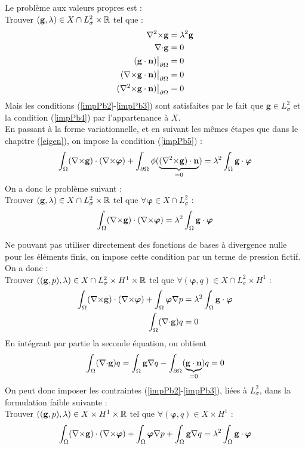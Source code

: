 Le problème aux valeurs propres est :\\
Trouver $(\mathbf{g},\lambda)\in X\cap L^2_\sigma\times{\mathbb{R}}$ tel que :
\begin{align}
{\nabla^2\times}\mathbf{g}&=\lambda^2\mathbf{g} \label{impPb1}\\
{\nabla\cdot}\mathbf{g}&=0 \label{impPb2}\\
(\mathbf{g}\cdot\mathbf{n}){\big\rvert_{\partial\Omega}}&=0 \label{impPb3}\\
({\nabla\times}\mathbf{g}\cdot\mathbf{n}){\big\rvert_{\partial\Omega}}&=0 \label{impPb4}\\
({\nabla^2\times}\mathbf{g}\cdot\mathbf{n}){\big\rvert_{\partial\Omega}}&=0 \label{impPb5}
\end{align}
Mais les conditions (\ref{impPb2}-\ref{impPb3}) sont satisfaites par le fait que $\mathbf{g}\in L^2_\sigma$ et la condition (\ref{impPb4}) par l'appartenance à $X$.\\

En passant à la forme variationnelle, et en suivant les mêmes étapes que dans le chapitre (\ref{eigen}), on impose la condition (\ref{impPb5}) :
\[ \int_\Omega ({\nabla\times}\mathbf{g})\cdot({\nabla\times}\bm{\varphi}) + \int_{\partial\Omega} \phi(\underbrace{({\nabla^2\times} \mathbf{g})\cdot\mathbf{n}}_{=0})= \lambda^2\int_\Omega \mathbf{g}\cdot\bm{\varphi} \]
On a donc le problème suivant :\\
Trouver $(\mathbf{g},\lambda)\in X\cap L^2_\sigma\times{\mathbb{R}}$ tel que $\forall \bm{\varphi}\in X\cap L^2_\sigma$ :
\[ \int_\Omega ({\nabla\times}\mathbf{g})\cdot({\nabla\times}\bm{\varphi}) = \lambda^2\int_\Omega \mathbf{g}\cdot\bm{\varphi} \]

Ne pouvant pas utiliser directement des fonctions de bases à divergence nulle pour les éléments finis, on impose cette condition par un terme de pression fictif. On a donc :\\
Trouver $((\mathbf{g},p),\lambda)\in X\cap L^2_\sigma \times H^1 \times {\mathbb{R}}$ tel que $\forall (\bm{\varphi},q)\in X\cap L^2_\sigma \times H^1$ :
\begin{align*}
\int_\Omega ({\nabla\times}\mathbf{g})\cdot({\nabla\times}\bm{\varphi}) + \int_\Omega\bm{\varphi}{\nabla} p &= \lambda^2\int_\Omega \mathbf{g}\cdot\bm{\varphi}\\
\int_\Omega ({\nabla\cdot}\mathbf{g}) q &= 0
\end{align*}
En intégrant par partie la seconde équation, on obtient
\[ \int_\Omega ({\nabla\cdot}\mathbf{g}) q = \int_\Omega \mathbf{g}{\nabla} q - \int_{\partial\Omega} (\underbrace{\mathbf{g}\cdot \mathbf{n}}_{=0})q = 0 \]
On peut donc imposer les contraintes (\ref{impPb2}-\ref{impPb3}), liées à $L^2_\sigma$, dans la formulation faible suivante :\\
Trouver $((\mathbf{g},p),\lambda)\in X \times H^1 \times {\mathbb{R}}$ tel que $\forall (\bm{\varphi},q)\in X \times H^1$ :
\[ \int_\Omega ({\nabla\times}\mathbf{g})\cdot({\nabla\times}\bm{\varphi}) + \int_\Omega\bm{\varphi}{\nabla} p + \int_\Omega \mathbf{g}{\nabla} q = \lambda^2\int_\Omega \mathbf{g}\cdot\bm{\varphi} \]

